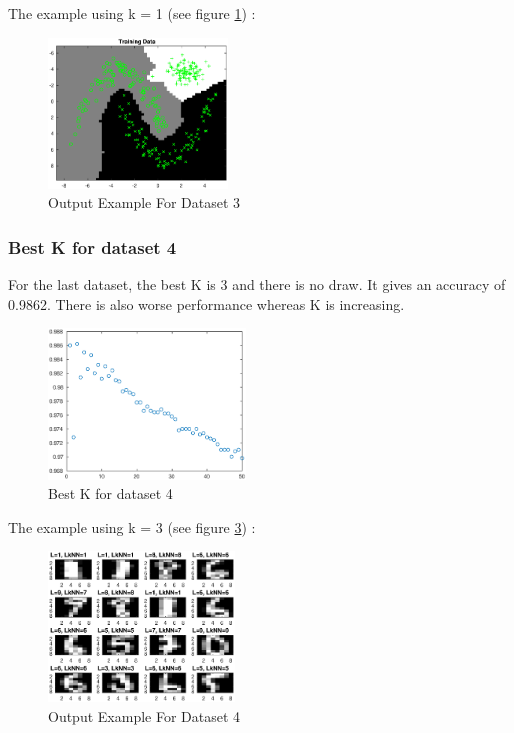 \documentclass{article}
\begin{document}
The example using k = 1 (see figure \ref{fig:resultsknn3}) :

\begin{figure}[!htb]
\centering
\includegraphics[height=4cm]{images/resultsknn3}
\caption{Output Example For Dataset 3}
\label{fig:resultsknn3}
\end{figure}

\subsubsection {Best K for dataset 4}
For the last dataset, the best K is 3 and there is no draw. It gives an accuracy of 0.9862. There is also worse performance whereas K is increasing.

\begin{figure}[!htb]
\centering
\includegraphics[height=4cm]{images/bestkdataset4}
\caption{Best K for dataset 4}
\label{fig:bestkdataset4}
\end{figure}

The example using k = 3 (see figure \ref{fig:resultsknn4}) :

\begin{figure}[!htb]
\centering
\includegraphics[height=4cm]{images/resultsknn4}
\caption{Output Example For Dataset 4}
\label{fig:resultsknn4}
\end{figure}
\end{document}
